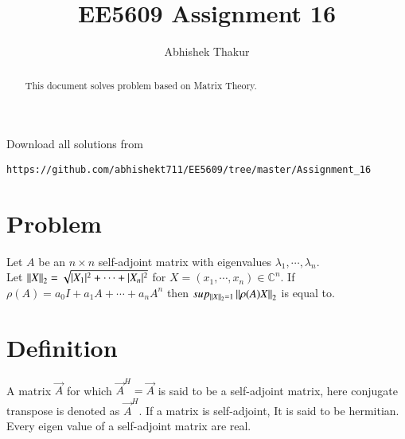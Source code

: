 \documentclass[journal,12pt,twocolumn]{IEEEtran}
\begin{document}
     \def\rightbox#1{\makebox[0in][r]{#1}}
     \def\centbox#1{\makebox[0in]{#1}}
     \def\topbox#1{\raisebox{-\baselineskip}[0in][0in]{#1}}
     \def\midbox#1{\raisebox{-0.5\baselineskip}[0in][0in]{#1}}
\vspace{3cm}
\title{EE5609 Assignment 16}
\author{Abhishek Thakur}
\maketitle
\newpage
\bigskip
\renewcommand{\thefigure}{\theenumi}
\renewcommand{\thetable}{\theenumi}
\begin{abstract}
This document solves problem based on Matrix Theory.
\end{abstract}
Download all solutions from 
\begin{lstlisting}
https://github.com/abhishekt711/EE5609/tree/master/Assignment_16
\end{lstlisting}
\section{Problem}
Let $A$ be an $n\times n$ self-adjoint matrix with eigenvalues $\lambda_1,\cdots,\lambda_n$.\\
Let $\left\lVert X\right\rVert_2=\sqrt{\lvert{X_1}\rvert^2+\cdots +\lvert{X_n}\rvert^2}$ for $X=(x_1,\cdots,x_n)\in \mathbb{C}^n$. If $\rho(A)=a_0I+a_1A+\cdots+a_nA^n$ then  $sup_{\left\lVert X\right\rVert_{2}=1}\left\lVert\rho(A)X\right\rVert_2$ is equal to.
\section{Definition}
A matrix $\vec{A}$ for which $\vec{A}^H=\vec{A}$ is said to be a self-adjoint matrix, here conjugate transpose is denoted as $\vec{A}^H$. If a matrix is self-adjoint, It is said to be hermitian. Every eigen value of a self-adjoint matrix are real.
\end{document}
